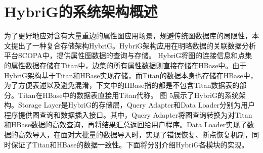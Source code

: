 
\chapter{HybriG的系统架构概述}
为了更好地应对含有大量重边的属性图应用场景，规避传统图数据库的局限性，本文提出了一种复合存储架构HybriG。HybriG架构应用在明略数据的关联数据分析平台SCOPA中，提供属性图数据的查询与存储。
HybriG将图的连接信息和点集的属性数据存储在Titan中，边集的所有属性数据则直接存储在HBase中。由于HybriG架构基于Titan和HBase实现存储，而Titan的数据本身也存储在HBase中，为了方便表述以及避免混淆，下文中的HBase指的都是不包含Titan数据表的部分。Titan在HBase中的数据表直接用Titan代称。
图 5展示了HybriG的系统架构。Storage Layer是HybriG的存储层，Query Adapter和Data Loader分别为用户程序提供图查询和数据插入接口。其中，Query Adapter将图查询转换为对Titan和HBase数据的高效查询，再将结果汇总返回给用户程序。Data Loader实现了数据的高效导入，在面对大批量的数据导入时，实现了错误恢复、断点恢复机制，同时保证了Titan和HBase的数据一致性。下面将分别介绍HybriG各模块的实现。


